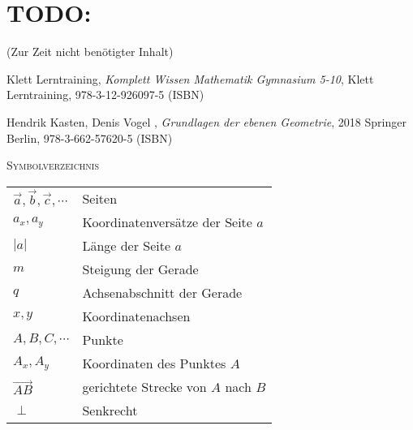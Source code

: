 \documentclass[a4paper]{amsart}
\theoremstyle{definition}
\begin{document}
\section{TODO:}
\begin{backup}
    (Zur Zeit nicht benötigter Inhalt)
\end{backup}

\begin{thebibliography}{9}

      Klett Lerntraining, \emph{Komplett Wissen Mathematik Gymnasium 5-10},
      Klett Lerntraining, 978-3-12-926097-5 (ISBN)
      
       Hendrik Kasten, Denis Vogel , \emph{Grundlagen der ebenen Geometrie},
      2018 Springer Berlin, 978-3-662-57620-5 (ISBN)

\end{thebibliography}

\begin{large}
    \centerline{\textsc{Symbolverzeichnis}}
\end{large}
\bigskip

\renewcommand*{\arraystretch}{1}

\begin{tabular}{ll}
    $\vec a,\vec b, \vec c, \cdots$               &Seiten\\
    $a_x,a_y$                   &Koordinatenversätze der Seite $a$\\
    $|a|$                       &Länge der Seite $a$\\
    $m$                         &Steigung der Gerade\\
    $q$                         &Achsenabschnitt der Gerade\\
    $x, y$                      &Koordinatenachsen\\
    $A, B, C, \cdots$          &Punkte\\
    $A_x, A_y$                 &Koordinaten des Punktes $A$\\
    $\overrightarrow{AB}$      &gerichtete Strecke von $A$ nach $B$\\
    $\perp$                    &Senkrecht
\end{tabular}
\end{document}
